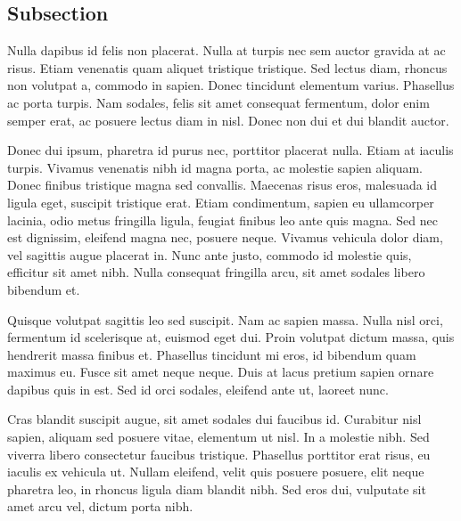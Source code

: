 \documentclass[../report_tablet.tex]{subfiles}
\begin{document}
\subsection{Subsection}
Nulla dapibus id felis non placerat. Nulla at turpis nec sem auctor gravida at ac risus.
Etiam venenatis quam aliquet tristique tristique. Sed lectus diam, rhoncus non volutpat a,
commodo in sapien. Donec tincidunt elementum varius. Phasellus ac porta turpis. Nam sodales,
felis sit amet consequat fermentum, dolor enim semper erat, ac posuere lectus diam in nisl.
Donec non dui et dui blandit auctor.

Donec dui ipsum, pharetra id purus nec, porttitor placerat nulla. Etiam at iaculis turpis.
Vivamus venenatis nibh id magna porta, ac molestie sapien aliquam. Donec finibus tristique magna
sed convallis. Maecenas risus eros, malesuada id ligula eget, suscipit tristique erat. Etiam
condimentum, sapien eu ullamcorper lacinia, odio metus fringilla ligula, feugiat finibus leo ante
quis magna. Sed nec est dignissim, eleifend magna nec, posuere neque. Vivamus vehicula dolor diam,
vel sagittis augue placerat in. Nunc ante justo, commodo id molestie quis, efficitur sit amet nibh.
Nulla consequat fringilla arcu, sit amet sodales libero bibendum et.

Quisque volutpat sagittis leo sed suscipit. Nam ac sapien massa. Nulla nisl orci, fermentum id
scelerisque at, euismod eget dui. Proin volutpat dictum massa, quis hendrerit massa finibus et.
Phasellus tincidunt mi eros, id bibendum quam maximus eu. Fusce sit amet neque neque. Duis at lacus
pretium sapien ornare dapibus quis in est. Sed id orci sodales, eleifend ante ut, laoreet nunc.

Cras blandit suscipit augue, sit amet sodales dui faucibus id. Curabitur nisl sapien, aliquam sed
posuere vitae, elementum ut nisl. In a molestie nibh. Sed viverra libero consectetur faucibus tristique.
Phasellus porttitor erat risus, eu iaculis ex vehicula ut. Nullam eleifend, velit quis posuere
posuere, elit neque pharetra leo, in rhoncus ligula diam blandit nibh. Sed eros dui, vulputate sit
amet arcu vel, dictum porta nibh.
\end{document}
